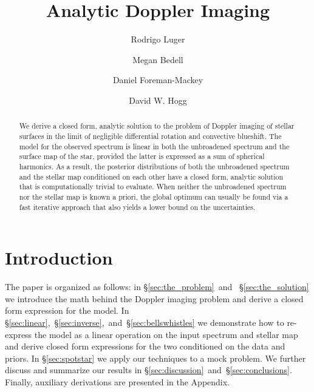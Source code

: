 \documentclass[modern]{aastex62}
\begin{document}
\title{Analytic Doppler Imaging}

\author[0000-0002-0296-3826]{Rodrigo Luger}
%
\author{Megan Bedell}
%
\author{Daniel Foreman-Mackey}
%
\author{David W. Hogg}

\begin{abstract} 
We derive a closed form, analytic solution to the problem of Doppler imaging
of stellar surfaces in the limit of negligible differential rotation and
convective blueshift. The model for the observed spectrum is linear in 
both the unbroadened spectrum and the surface map of the star, provided the
latter is expressed as a sum of spherical harmonics. As a result, the 
posterior distributions of both the unbroadened spectrum and the stellar map
conditioned on each other have a closed form, analytic solution that is 
computationally trivial to evaluate. When neither the unbroadened spectrum
nor the stellar map is known a priori, the global optimum can usually be
found via a fast iterative approach that also yields a lower bound on the
uncertainties.
%
\href{https://github.com/rodluger/paparazzi}{\color{linkcolor}\faGithub}
\end{abstract}

%
\section{Introduction}
%

%

The paper is organized as follows: in \S\ref{sec:the_problem}~and~%
\S\ref{sec:the_solution} we introduce the math behind the Doppler imaging
problem and derive a closed form expression for the model. In
\S\ref{sec:linear},~\S\ref{sec:inverse},~and~\S\ref{sec:bellswhistles} 
we demonstrate how to re-express 
the model as a linear operation on the input spectrum and stellar map and
derive closed form expressions for the two conditioned on the data and priors.
In \S\ref{sec:spotstar} we apply our techniques to a mock problem. We
further discuss and summarize our results in
\S\ref{sec:discussion}~and~\S\ref{sec:conclusions}. Finally, auxiliary
derivations are presented in the Appendix.
\end{document}
